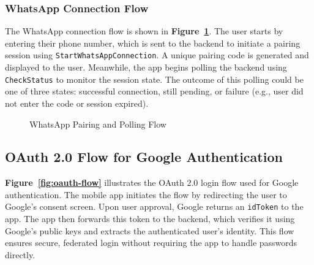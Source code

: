 \subsubsection*{WhatsApp Connection Flow}

The WhatsApp connection flow is shown in \textbf{Figure~\ref{fig:whatsapp-flow}}. The user starts by entering their phone number, which is sent to the backend to initiate a pairing session using \texttt{StartWhatsAppConnection}. A unique pairing code is generated and displayed to the user. Meanwhile, the app begins polling the backend using \texttt{CheckStatus} to monitor the session state. The outcome of this polling could be one of three states: successful connection, still pending, or failure (e.g., user did not enter the code or session expired).

\begin{figure}[h!]
    \centering
    \caption{WhatsApp Pairing and Polling Flow}
    \label{fig:whatsapp-flow}
\end{figure}
    
\subsection{OAuth 2.0 Flow for Google Authentication}

\textbf{Figure~\ref{fig:oauth-flow}} illustrates the OAuth 2.0 login flow used for Google authentication. The mobile app initiates the flow by redirecting the user to Google's consent screen. Upon user approval, Google returns an \texttt{idToken} to the app. The app then forwards this token to the backend, which verifies it using Google's public keys and extracts the authenticated user's identity. This flow ensures secure, federated login without requiring the app to handle passwords directly.

